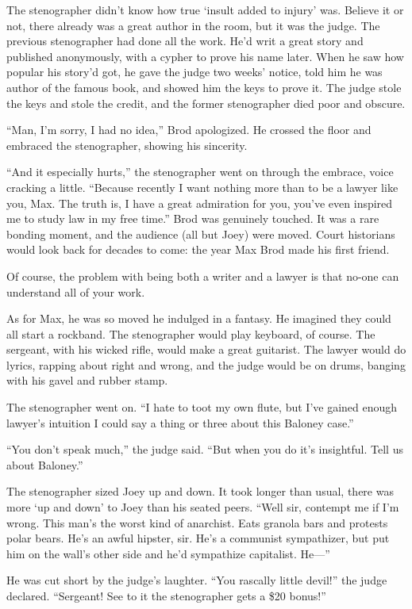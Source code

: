 \documentclass[oneside]{book}
\begin{document}
The stenographer didn't know how true `insult added to injury' was.
Believe it or not, there already was a great author in the room, but it
was the judge.  The previous stenographer had
done all the work.  He'd writ a great story and published anonymously,
with a cypher to prove his name later.  When he saw how popular his
story'd got, he gave the judge two
weeks' notice, told him he was author of the famous book, and showed him the
keys to prove it.  The judge stole the keys and stole the credit, and the
former stenographer died poor and obscure.

``Man, I'm sorry, I had no idea,'' Brod apologized.  He crossed the floor and embraced the stenographer,
showing his sincerity.


``And it especially hurts,'' the stenographer went on through the embrace, voice cracking a little.
``Because recently I want nothing more
than to be a lawyer like you, Max.  The truth is, I have a great admiration
for you, you've even inspired me to study law in my free time.''
Brod was genuinely touched.  It was a rare bonding moment, and the audience (all but Joey)
were moved.  Court historians would look back
for decades to come: the year Max Brod made his first friend.

Of course, the problem with being both a writer and a lawyer is that no-one can
understand all of your work.

As for Max, he was so moved he indulged in a fantasy.
He imagined they could all start a rockband.
The stenographer would play keyboard, of course.
The sergeant, with his wicked rifle, would make a great guitarist.
The lawyer would do lyrics, rapping about right and wrong,
and the judge would be on drums, banging with his gavel and rubber stamp.

The stenographer went on.  ``I hate to toot my own flute, but I've gained enough
lawyer's intuition I could say a thing or three about this Baloney case.''

``You don't speak much,'' the judge said.  ``But when you do it's
insightful.  Tell us about Baloney.''

The stenographer sized Joey up and down.  It took longer
than usual, there was more `up and down' to Joey than his seated peers.
``Well sir, contempt me if I'm wrong.  This man's the worst kind of anarchist.
Eats granola bars and protests polar bears.  He's an awful hipster, sir.
He's a communist sympathizer, but put him on the wall's other side and he'd sympathize
capitalist.  He---''

He was cut short by the judge's laughter.  ``You rascally little devil!'' the judge
declared.  ``Sergeant!  See to it the stenographer gets a \$20 bonus!''
\end{document}
